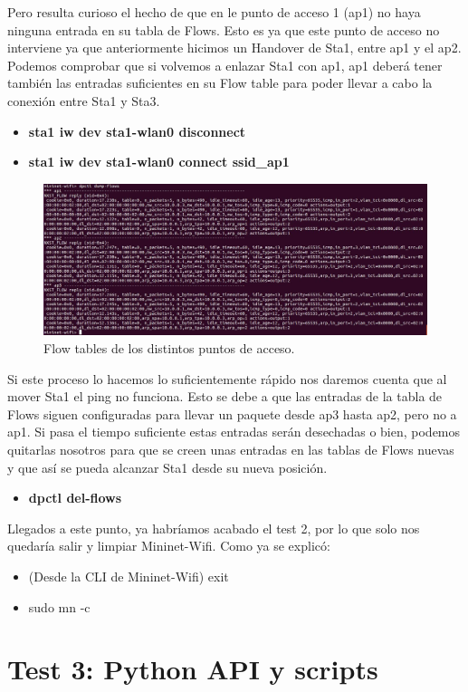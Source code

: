 Pero resulta curioso el hecho de que en le punto de acceso 1 (ap1) no haya ninguna entrada en su tabla de Flows. Esto es ya que este punto de acceso no interviene ya que anteriormente hicimos un Handover de Sta1, entre ap1 y el ap2. Podemos comprobar que si volvemos a enlazar Sta1 con ap1, ap1 deberá tener también las entradas suficientes en su Flow table para poder llevar a cabo la conexión entre Sta1 y Sta3. 
\begin{itemize}
    \item \textbf{sta1 iw dev sta1-wlan0 disconnect} 
    \item \textbf{sta1 iw dev sta1-wlan0 connect ssid\_ap1}
\end{itemize}
\begin{figure}[!htb]
  \centering
    \includegraphics[width=0.9\linewidth]{./img/test/18.JPG}
    \caption{Flow tables de los distintos puntos de acceso.}
  \label{fig:yo}
\end{figure}
\newpage
Si este proceso lo hacemos lo suficientemente rápido nos daremos cuenta que al mover Sta1 el ping no funciona. Esto se debe a que las entradas de la tabla de Flows siguen configuradas para llevar un paquete desde ap3 hasta ap2, pero no a ap1. Si pasa el tiempo suficiente estas entradas serán desechadas o bien, podemos quitarlas nosotros para que se creen unas entradas en las tablas de Flows nuevas y que así se pueda alcanzar Sta1 desde su nueva posición.
\begin{itemize}
    \item \textbf{dpctl del-flows}
\end{itemize}
Llegados a este punto, ya habríamos acabado el test 2, por lo que solo nos quedaría salir y limpiar Mininet-Wifi. Como ya se explicó:

\begin{itemize}
    \item (Desde la CLI de Mininet-Wifi) exit
    \item  sudo mn -c
\end{itemize}
\newpage
\section{Test 3: Python API y scripts}

